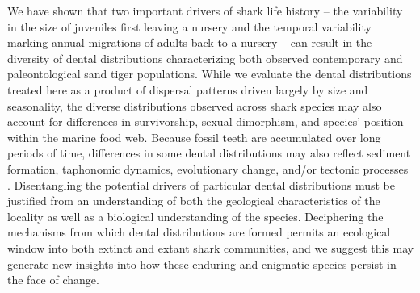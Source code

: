 \documentclass[]{rsos}%
\begin{document}
We have shown that two important drivers of shark life history -- the variability in the size of juveniles first leaving a nursery and the temporal variability marking annual migrations of adults back to a nursery -- can result in the diversity of dental distributions characterizing both observed contemporary and paleontological sand tiger populations.
While we evaluate the dental distributions treated here as a product of dispersal patterns driven largely by size and seasonality, the diverse distributions observed across shark species may also account for differences in survivorship, sexual dimorphism, and species' position within the marine food web.
Because fossil teeth are accumulated over long periods of time, differences in some dental distributions may also reflect sediment formation, taphonomic dynamics, evolutionary change, and/or tectonic processes \cite{Whitenack}. 
Disentangling the potential drivers of particular dental distributions must be justified from an understanding of both the geological characteristics of the locality as well as a biological understanding of the species.
Deciphering the mechanisms from which dental distributions are formed permits an ecological window into both extinct and extant shark communities, and we suggest this may generate new insights into how these enduring and enigmatic species persist in the face of change.
\end{document}
